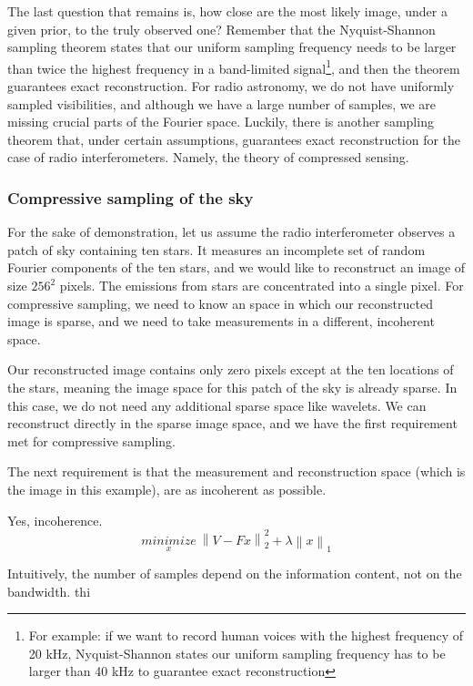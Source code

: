 The last question that remains is, how close are the most likely image, under a given prior, to the truly observed one? Remember that the Nyquist-Shannon sampling theorem states that our uniform sampling frequency needs to be larger than twice the highest frequency in a band-limited signal\footnote{For example: if we want to record human voices with the highest frequency of 20 kHz, Nyquist-Shannon states our uniform sampling frequency has to be larger than 40 kHz to guarantee exact reconstruction}, and then the theorem guarantees exact reconstruction. For radio astronomy, we do not have uniformly sampled visibilities, and although we have a large number of samples, we are missing crucial parts of the Fourier space. Luckily, there is another sampling theorem that, under certain assumptions, guarantees exact reconstruction for the case of radio interferometers. Namely, the theory of compressed sensing.

\subsubsection{Compressive sampling of the sky}
For the sake of demonstration, let us assume the radio interferometer observes a patch of sky containing ten stars. It measures an incomplete set of random Fourier components of the ten stars, and we would like to reconstruct an image of size $256^2$ pixels. The emissions from stars are concentrated into a single pixel. For compressive sampling, we need to know an space in which our reconstructed image is sparse, and we need to take measurements in a different, incoherent space.

Our reconstructed image contains only zero pixels except at the ten locations of the stars, meaning the image space for this patch of the sky is already sparse. In this case, we do not need any additional sparse space like wavelets. We can reconstruct directly in the sparse image space, and we have the first requirement met for compressive sampling. 

The next requirement is that the measurement and reconstruction space (which is the image in this example), are as incoherent as possible. 

Yes, incoherence.
\begin{equation}\label{intro:linear:compressed2}
\underset{x}{minimize} \: \left \| V - Fx \right \|_2^2 + \lambda \left \| x \right \|_1
\end{equation}


Intuitively, the number of samples depend on the information content, not on the bandwidth. thi


